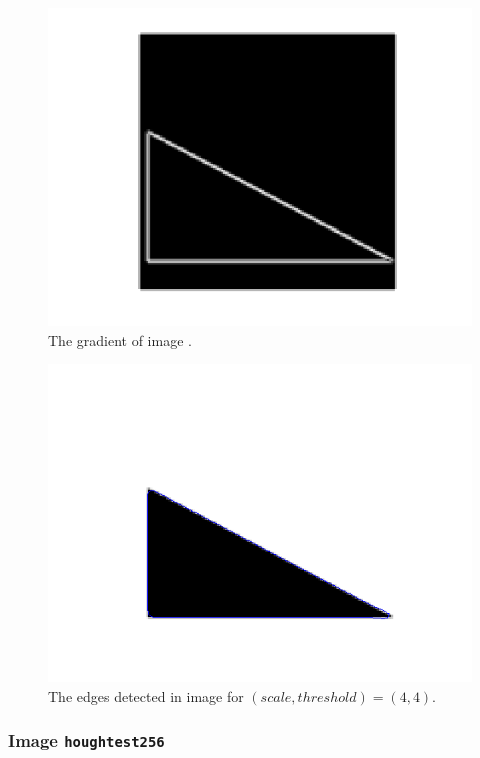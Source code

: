     \begin{figure}[H]
      \centering
      \includegraphics[scale=0.8]{./images/Q8/triangle128/3.png}
      \caption{The gradient of image .}
      \label{fig:Q8_triangle128_3}
    \end{figure}

    \begin{figure}[H]
      \centering
      \includegraphics[scale=0.8]{./images/Q8/triangle128/4.png}
      \caption{The edges detected in image  for
        $(scale, threshold) = (4,4)$.}
      \label{fig:Q8_triangle128_4}
    \end{figure}


  \subsubsection{Image \texttt{houghtest256}}

